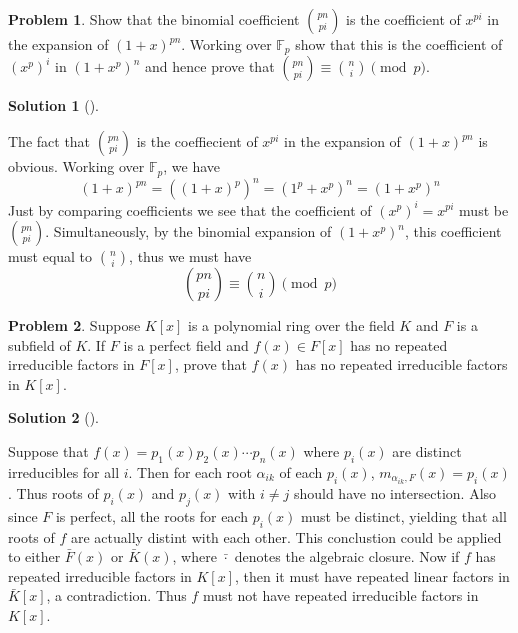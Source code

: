 \documentclass{article}
\theoremstyle{definition}
\newtheorem{prob}{Problem}
\newtheorem*{sol}{Solution}
\newenvironment{sols}[1][]{%
  \begin{sol}[#1]$ $\par\nobreak\ignorespaces
}{%
  \end{sol}
}
\begin{document}
\setcounter{prob}{8}
\begin{prob}
	Show that the binomial coefficient $\binom{pn}{pi}$ is the coefficient of $x^{pi}$ in the expansion of $(1 + x)^{pn}$.
	Working over $\mathbb{F}_p$ show that this is the coefficient of $(x^p)^i$ in $(1 + x^p)^n$ and hence prove that $\binom{pn}{pi} \equiv \binom{n}{i} \pmod{p}$.
\end{prob}

\begin{sols}
	The fact that $\binom{pn}{pi}$ is the coeffiecient of $x^{pi}$ in the expansion of $(1 + x)^{pn}$ is obvious.
	Working over $\mathbb{F}_p$, we have
	\[
		(1 + x)^{pn} = ((1 + x)^p)^n = (1^p + x^p)^n = (1 + x^p)^n
	\]
	Just by comparing coefficients we see that the coefficient of $(x^p)^i = x^{pi}$ must be $\binom{pn}{pi}$.
	Simultaneously, by the binomial expansion of $(1 + x^p)^n$, this coefficient must equal to $\binom{n}{i}$, thus we must have
	\[
		\binom{pn}{pi} \equiv \binom{n}{i} \pmod{p}
	\]
\end{sols}

\setcounter{prob}{10}
\begin{prob}
	Suppose $K[x]$ is a polynomial ring over the field $K$ and $F$ is a subfield of $K$.
	If $F$ is a perfect field and $f(x) \in F[x]$ has no repeated irreducible factors in $F[x]$, prove that $f(x)$ has no repeated irreducible factors in $K[x]$.
\end{prob}

\begin{sols}
	Suppose that $f(x) = p_1(x) p_2(x) \cdots p_n(x)$ where $p_i(x)$ are distinct irreducibles for all $i$.
	Then for each root $\alpha_{ik}$ of each $p_i(x)$, $m_{\alpha_{ik}, F}(x) = p_i(x)$.
	Thus roots of $p_i(x)$ and $p_j(x)$ with $i \neq j$ should have no intersection.
	Also since $F$ is perfect, all the roots for each $p_i(x)$ must be distinct, yielding that all roots of $f$ are actually distint with each other.
	This conclustion could be applied to either $\bar{F}(x)$ or $\bar{K}(x)$, where $\bar{\cdot}$ denotes the algebraic closure.
	Now if $f$ has repeated irreducible factors in $K[x]$, then it must have repeated linear factors in $\bar{K}[x]$, a contradiction.
	Thus $f$ must not have repeated irreducible factors in $K[x]$.
\end{sols}
\end{document}
